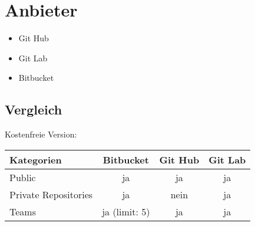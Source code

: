 \section{Anbieter}
\begin{frame}
\begin{itemize}
	\item Git Hub
	\item Git Lab
	\item Bitbucket
\end{itemize}
\end{frame}
\subsection{Vergleich}
\begin{frame}
	Kostenfreie Version:\vspace*{1em}\\
\begin{center}
	\begin{tabular}{l|c|c|c}
		Kategorien & Bitbucket & Git Hub & Git Lab \\\hline
		Public & ja & ja & ja\\
		Private Repositories & ja & nein & ja \\
		Teams & ja (limit: 5) & ja & ja\\
	\end{tabular}
\end{center}
\end{frame}